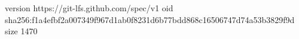version https://git-lfs.github.com/spec/v1
oid sha256:f1a4efbf2a007349f967d1ab0f8231d6b77bdd868c16506747d74a53b3829f9d
size 1470
